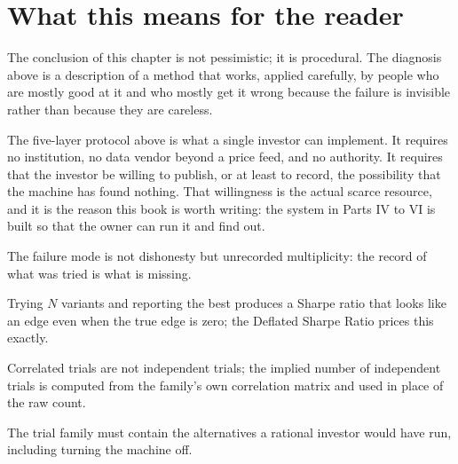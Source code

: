 \section{What this means for the reader}

The conclusion of this chapter is not pessimistic; it is procedural. The
diagnosis above is a description of a method that works, applied carefully,
by people who are mostly good at it and who mostly get it wrong because the
failure is invisible rather than because they are careless.

The five-layer protocol above is what a single investor can implement. It
requires no institution, no data vendor beyond a price feed, and no
authority. It requires that the investor be willing to publish, or at least
to record, the possibility that the machine has found nothing. That
willingness is the actual scarce resource, and it is the reason this book
is worth writing: the system in Parts IV to VI is built so that the owner
can run it and find out.

\begin{keytakeaways}
\item The failure mode is not dishonesty but unrecorded multiplicity: the
record of what was tried is what is missing.
\item Trying \(N\) variants and reporting the best produces a Sharpe ratio
that looks like an edge even when the true edge is zero; the Deflated
Sharpe Ratio prices this exactly.
\item Correlated trials are not independent trials; the implied number of
independent trials is computed from the family's own correlation matrix and
used in place of the raw count.
\item The trial family must contain the alternatives a rational investor
would have run, including turning the machine off.
\end{keytakeaways}

